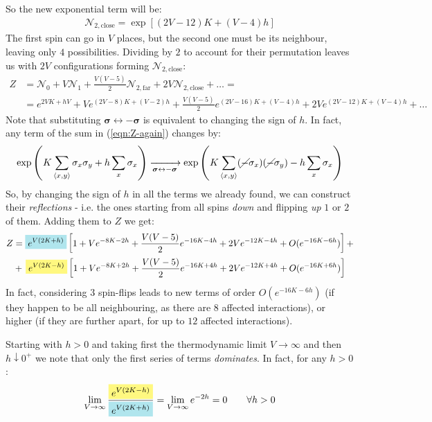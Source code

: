 \documentclass[../../main.tex]{subfiles}
\begin{document}
So the new exponential term will be:
\begin{align*}
    \mathcal{N}_{2,\mathrm{close}} = \exp[(2V - 12)K + (V-4)h]
\end{align*}
The first spin can go in $V$ places, but the second one must be its neighbour, leaving only $4$ possibilities. Dividing by $2$ to account for their permutation leaves us with $2V$ configurations forming $\mathcal{N}_{2,\mathrm{close}}$:
\begin{align*}
    Z &= \mathcal{N}_0 + V \mathcal{N}_1 + \frac{V(V-5)}{2} \mathcal{N}_{2,\mathrm{far}} + 2V \mathcal{N}_{2,\mathrm{close}} + \dots =\\
    &= e^{2VK + hV} + V e^{(2V-8)K + (V-2)h} + \frac{V(V-5)}{2} e^{(2V-16)K + (V-4)h}  + 2V e^{(2V-12)K + (V-4)h} + \dots
\end{align*}
Note that substituting $\bm{\sigma} \leftrightarrow -\bm{\sigma}$ is equivalent to changing the sign of $h$. In fact, any term of the sum in (\ref{eqn:Z-again}) changes by:
\begin{align*}
    \exp\left(K \sum_{\langle x,y \rangle} \sigma_x \sigma_y + h \sum_x \sigma_x\right) \xrightarrow[\bm{\sigma} \leftrightarrow -\bm{\sigma}]{} \exp\left(K \sum_{\langle x,y \rangle}(\cancel{-}\sigma_x)(\cancel{-}\sigma_y) - h\sum_x \sigma_x\right)
\end{align*}
So, by changing the sign of $h$ in all the terms we already found, we can construct their \textit{reflections} - i.e. the ones starting from all spins \textit{down} and flipping \textit{up} $1$ or $2$ of them. Adding them to $Z$ we get:
\begin{align*}
    Z &= \hlc{SkyBlue}{e^{V(2K+h)}}\left[1+ V e^{-8K - 2h} + \frac{V(V-5)}{2} e^{-16K - 4h} + 2 V e^{-12K - 4h}  + O(e^{-16K - 6h}) \right] +\\
    &+\,\hlc{Yellow}{e^{V(2K-h)}}\left[1 + V e^{-8K + 2h} + \frac{V(V-5)}{2} e^{-16K + 4h} + 2 V e^{-12K + 4h} + O(e^{-16K + 6h})\right] 
\end{align*}
In fact, considering $3$ spin-flips leads to new terms of order $O(e^{-16K - 6h})$ (if they happen to be all neighbouring, as there are $8$ affected interactions), or higher (if they are further apart, for up to $12$ affected interactions).

\medskip

Starting with $h > 0$ and taking first the thermodynamic limit $V \to \infty$ and then $h \downarrow 0^+$ we note that only the first series of terms \textit{dominates}. In fact, for any $h > 0$:
\begin{align*}
    \lim_{V \to \infty} \frac{\hlc{Yellow}{e^{V(2K-h)}}}{\hlc{SkyBlue}{e^{V(2K+h)}}} = \lim_{V \to \infty} e^{-2h} = 0 \qquad \forall h > 0
\end{align*}
\end{document}
